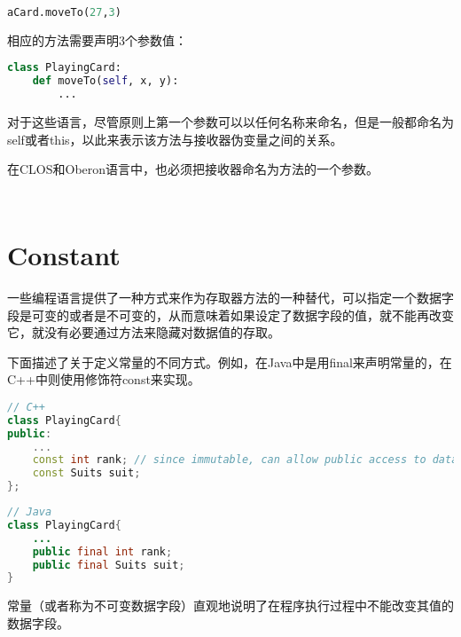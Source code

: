 \begin{lstlisting}[language=Python]
aCard.moveTo(27,3)
\end{lstlisting}

相应的方法需要声明3个参数值：


\begin{lstlisting}[language=Python]
class PlayingCard:
	def moveTo(self, x, y):
		...
\end{lstlisting}


对于这些语言，尽管原则上第一个参数可以以任何名称来命名，但是一般都命名为self或者this，以此来表示该方法与接收器伪变量之间的关系。

在CLOS和Oberon语言中，也必须把接收器命名为方法的一个参数。


\begin{lstlisting}[language=Java]

\end{lstlisting}




\begin{lstlisting}[language=Java]

\end{lstlisting}

\section{Constant}

一些编程语言提供了一种方式来作为存取器方法的一种替代，可以指定一个数据字段是可变的或者是不可变的，从而意味着如果设定了数据字段的值，就不能再改变它，就没有必要通过方法来隐藏对数据值的存取。


下面描述了关于定义常量的不同方式。例如，在Java中是用final来声明常量的，在C++中则使用修饰符const来实现。


\begin{lstlisting}[language=C++]
// C++
class PlayingCard{
public:
	...
	const int rank; // since immutable, can allow public access to data field.
	const Suits suit;
};
\end{lstlisting}


\begin{lstlisting}[language=Java]
// Java
class PlayingCard{
	...
	public final int rank;
	public final Suits suit;
}
\end{lstlisting}


常量（或者称为不可变数据字段）直观地说明了在程序执行过程中不能改变其值的数据字段。





